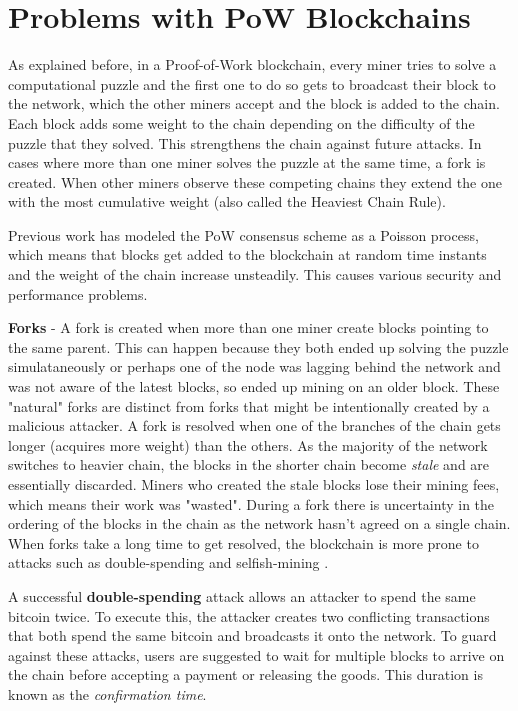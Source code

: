 
\newpage
\section{Problems with PoW Blockchains} \label{intro-problems}

As explained before, in a Proof-of-Work blockchain, every miner tries to solve a computational puzzle and the first one to do so gets to broadcast their block to the network, which the other miners accept and the block is added to the chain. 
Each block adds some weight to the chain depending on the difficulty of the puzzle that they solved. 
This strengthens the chain against future attacks.
In cases where more than one miner solves the puzzle at the same time, a fork is created. 
When other miners observe these competing chains they extend the one with the most cumulative weight (also called the Heaviest Chain Rule). 

Previous work \cite{bitcoinOriginal, Rosenfeld} has modeled the PoW consensus scheme as a Poisson process, which means that blocks get added to the blockchain at random time instants and the weight of the chain increase unsteadily. 
This causes various security and performance problems.

\textbf{Forks} - A fork is created when more than one miner create blocks pointing to the same parent. 
This can happen because they both ended up solving the puzzle simulataneously or perhaps one of the node was lagging behind the network and was not aware of the latest blocks, so ended up mining on an older block. 
These "natural" forks are distinct from forks that might be intentionally created by a malicious attacker.
A fork is resolved when one of the branches of the chain gets longer (acquires more weight) than the others.
As the majority of the network switches to heavier chain, the blocks in the shorter chain become \textit{stale} and are essentially discarded. 
Miners who created the stale blocks lose their mining fees, which means their work was "wasted".
During a fork there is uncertainty in the ordering of the blocks in the chain as the network hasn't agreed on a single chain.
When forks take a long time to get resolved, the blockchain is more prone to attacks such as double-spending and selfish-mining \cite{selfishmining, selfishMiningStrategies}. 

A successful \textbf{double-spending} attack allows an attacker to spend the same bitcoin twice.
To execute this, the attacker creates two conflicting transactions that both spend the same bitcoin and broadcasts it onto the network. 
To guard against these attacks, users are suggested to wait for multiple blocks to arrive on the chain before accepting a payment or releasing the goods. This duration is known as the \textit{confirmation time}.

